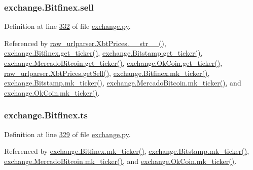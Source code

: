 \subsubsection[{\texorpdfstring{sell}{sell}}]{\setlength{\rightskip}{0pt plus 5cm}exchange.\+Bitfinex.\+sell}\hypertarget{classexchange_1_1_bitfinex_a9aebaf447f73e582f7bc626e526e0201}{}\label{classexchange_1_1_bitfinex_a9aebaf447f73e582f7bc626e526e0201}


Definition at line \hyperlink{exchange_8py_source_l00332}{332} of file \hyperlink{exchange_8py_source}{exchange.\+py}.



Referenced by \hyperlink{raw__urlparser_8py_source_l00074}{raw\+\_\+urlparser.\+Xbt\+Prices.\+\_\+\+\_\+str\+\_\+\+\_\+()}, \hyperlink{exchange_8py_source_l00340}{exchange.\+Bitfinex.\+get\+\_\+ticker()}, \hyperlink{exchange_8py_source_l00409}{exchange.\+Bitstamp.\+get\+\_\+ticker()}, \hyperlink{exchange_8py_source_l00543}{exchange.\+Mercado\+Bitcoin.\+get\+\_\+ticker()}, \hyperlink{exchange_8py_source_l00608}{exchange.\+Ok\+Coin.\+get\+\_\+ticker()}, \hyperlink{raw__urlparser_8py_source_l00065}{raw\+\_\+urlparser.\+Xbt\+Prices.\+get\+Sell()}, \hyperlink{exchange_8py_source_l00354}{exchange.\+Bitfinex.\+mk\+\_\+ticker()}, \hyperlink{exchange_8py_source_l00423}{exchange.\+Bitstamp.\+mk\+\_\+ticker()}, \hyperlink{exchange_8py_source_l00557}{exchange.\+Mercado\+Bitcoin.\+mk\+\_\+ticker()}, and \hyperlink{exchange_8py_source_l00622}{exchange.\+Ok\+Coin.\+mk\+\_\+ticker()}.

\subsubsection[{\texorpdfstring{ts}{ts}}]{\setlength{\rightskip}{0pt plus 5cm}exchange.\+Bitfinex.\+ts}\hypertarget{classexchange_1_1_bitfinex_abf872e8ea738acd33d34a00d9d9e92c4}{}\label{classexchange_1_1_bitfinex_abf872e8ea738acd33d34a00d9d9e92c4}


Definition at line \hyperlink{exchange_8py_source_l00329}{329} of file \hyperlink{exchange_8py_source}{exchange.\+py}.



Referenced by \hyperlink{exchange_8py_source_l00354}{exchange.\+Bitfinex.\+mk\+\_\+ticker()}, \hyperlink{exchange_8py_source_l00423}{exchange.\+Bitstamp.\+mk\+\_\+ticker()}, \hyperlink{exchange_8py_source_l00557}{exchange.\+Mercado\+Bitcoin.\+mk\+\_\+ticker()}, and \hyperlink{exchange_8py_source_l00622}{exchange.\+Ok\+Coin.\+mk\+\_\+ticker()}.

